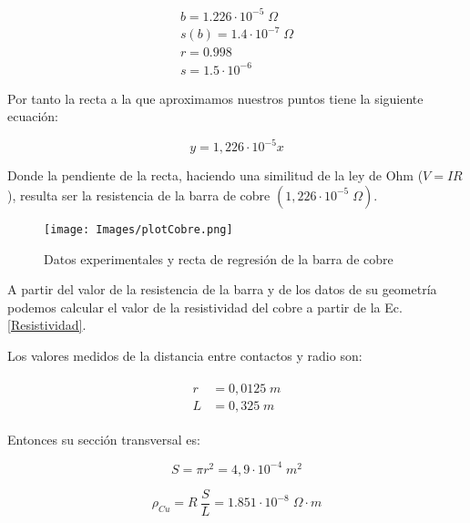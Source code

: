 \documentclass[a4paper,12pt,titlepage]{article}
\begin{document}
\begin{equation}
    \begin{gathered}
        b = 1.226 \cdot 10^{-5}\; \Omega
        \\
        s(b) = 1.4 \cdot 10^{-7}\; \Omega
        \\
        r = 0.998
        \\
        s = 1.5 \cdot 10^{-6}
    \end{gathered}
\end{equation}

Por tanto la recta a la que aproximamos nuestros puntos tiene la siguiente ecuación:

\begin{equation}
    y = 1,226 \cdot 10^{-5}x
\end{equation}

Donde la pendiente de la recta, haciendo una similitud de la ley de Ohm ($V=IR$), resulta ser la resistencia de la barra de cobre $(1,226 \cdot 10^{-5}\;  \Omega)$.

\begin{figure}[h!]
    \centering
    \texttt{[image: Images/plotCobre.png]}
    \caption{Datos experimentales y recta de regresión de la barra de cobre}
\end{figure}

\newpage

\par A partir del valor de la resistencia de la barra y de los datos de su geometría podemos calcular el valor de la resistividad del cobre a partir de la Ec.\ref{Resistividad}.

\par Los valores medidos de la distancia entre contactos y radio son:

\begin{align}
    \begin{split}
        r &= 0,0125\; m\\
        L &= 0,325\; m
    \end{split}
\end{align}

Entonces su sección transversal es:

\begin{equation}
    S = \pi r^2 = 4,9 \cdot 10^{-4}\; m^2
\end{equation}

\begin{equation}
    \rho_{Cu} = R \: \frac{S}{L} = 1.851 \cdot 10^{-8} \; \Omega \cdot m
\end{equation}
\end{document}

